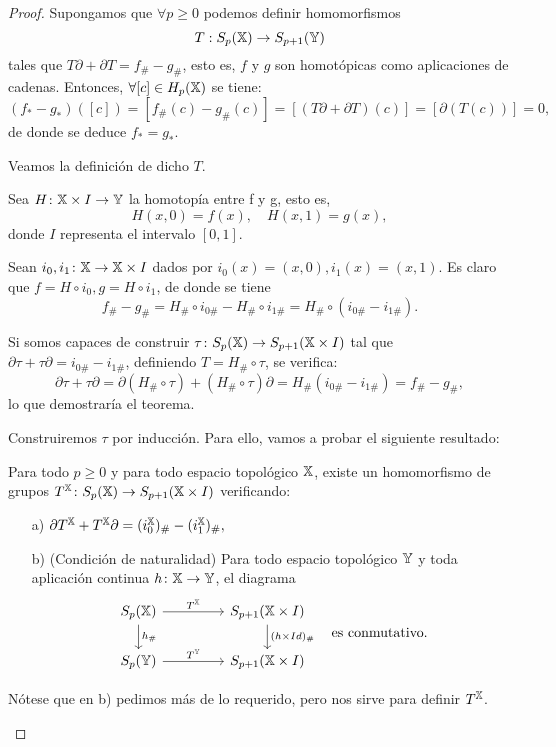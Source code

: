 \begin{proof}
  Supongamos que $\forall p \geq 0$ podemos definir homomorfismos \[T: S_{p}({\mathbb X}) \to S_{p+1}({\mathbb Y}) \] tales que $T\partial + \partial T = f_\# - g_\#$,
  esto es, $f$ y $g$ son homotópicas como aplicaciones de cadenas. Entonces, $\forall [c] \in H_p({\mathbb X})$ se tiene:
  \[ (f_* - g_*)([c]) = [f_\#(c) - g_\#(c)] = [(T\partial + \partial T)(c)] = [\partial(T(c))] = 0,\]
  de donde se deduce $f_* = g_*$.

  Veamos la definición de dicho $T$.

  Sea $H \colon {\mathbb X} \times I \to {\mathbb Y}$ la homotopía entre f y g, esto es,
  \[H(x, 0) = f(x), \quad H(x, 1) = g(x),\]
  donde $I$ representa el intervalo $[0, 1]$.

  Sean $i_0, i_1 \colon {\mathbb X} \to {\mathbb X} \times I$ dados por $i_0(x) = (x, 0), i_1(x) = (x, 1)$. Es claro que $f = H \circ i_0, g = H \circ i_1$, de donde
  se tiene \[ f_\# - g_\# = H_\# \circ i_{0\#} - H_\# \circ i_{1\#} = H_\# \circ (i_{0\#} - i_{1\#}). \]

  Si somos capaces de construir $\tau \colon S_{p}({\mathbb X}) \to S_{p+1}({\mathbb X} \times I)$ tal que $\partial \tau + \tau \partial = i_{0\#} - i_{1\#}$, definiendo
  $T = H_\# \circ \tau$, se verifica:
  \[ \partial \tau + \tau \partial = \partial(H_\# \circ \tau) + (H_\# \circ \tau)\partial = H_\#(i_{0\#} - i_{1\#}) = f_\# - g_\#,  \]
  lo que demostraría el teorema.

  Construiremos $\tau$ por inducción. Para ello, vamos a probar el siguiente resultado:
  \begin{lemma}
    Para todo $p \geq 0$ y para todo espacio topológico ${\mathbb X}$, existe un homomorfismo de grupos $T^{\mathbb X} \colon S_{p}({\mathbb X}) \to S_{p+1}({\mathbb X} \times I)$ verificando:
    \begin{itemize}
      \item[a)] $\partial T^{\mathbb X} + T^{\mathbb X} \partial = (i_0^{\mathbb X})_\# - (i_1^{\mathbb X})_\#,$
      \item[b)] (Condición de naturalidad) Para todo espacio topológico ${\mathbb Y}$ y toda aplicación continua $h \colon {\mathbb X} \to {\mathbb Y}$, el diagrama
      \[
      \begin{tikzcd}
        \SX{p} \arrow{r}{T^\X} \arrow{d}{h_\#} & [2em] S_{p+1}(\X \times I) \arrow{d}{(h \times Id)_\#} \\
        \SY{p} \arrow{r}{T^\Y}                 & S_{p+1}(\X \times I)
      \end{tikzcd}
      \quad \text{es conmutativo.}
      \]
    \end{itemize}
    Nótese que en b) pedimos más de lo requerido, pero nos sirve para definir $T^{\mathbb X}$.
  \end{lemma}


\end{proof}
